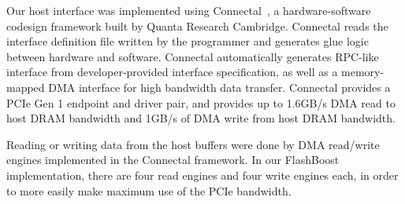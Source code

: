 Our host interface was implemented using Connectal~\cite{connectal}, a
hardware-software codesign framework built by Quanta Research Cambridge.
Connectal reads the interface definition file written by the programmer and
generates glue logic between hardware and software. Connectal automatically
generates RPC-like interface from developer-provided interface specification, as
well as a memory-mapped DMA interface for high bandwidth data transfer.
Connectal provides a PCIe Gen 1 endpoint and driver pair, and provides up to
1.6GB/s DMA read to host DRAM bandwidth and 1GB/s of DMA write from host DRAM
bandwidth. 

Reading or writing data from the host buffers were done by DMA read/write
engines implemented in the Connectal framework. In our FlashBoost
implementation, there are four read engines and four write engines each, in
order to more easily make maximum use of the PCIe bandwidth. 


